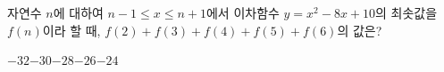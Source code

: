 자연수 $n$에 대하여 $n-1\le x\le n+1$에서 이차함수 $y=x^2-8x+10$의 최솟값을 $f(n)$이라 할 때, $f(2)+f(3)+f(4)+f(5)+f(6)$의 값은?
\begin{choices32}{$-32$}{$-30$}{$-28$}{$-26$}{$-24$}\end{choices32}
